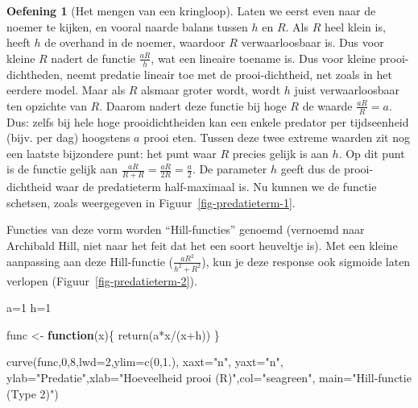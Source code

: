 \documentclass[
  a4paper,
]{scrbook}
\newenvironment{Shaded}{\begin{snugshade}}{\end{snugshade}}
\newcommand{\AttributeTok}[1]{\textcolor[rgb]{0.40,0.45,0.13}{#1}}
\newcommand{\ControlFlowTok}[1]{\textcolor[rgb]{0.00,0.23,0.31}{\textbf{#1}}}
\newcommand{\DecValTok}[1]{\textcolor[rgb]{0.68,0.00,0.00}{#1}}
\newcommand{\FloatTok}[1]{\textcolor[rgb]{0.68,0.00,0.00}{#1}}
\newcommand{\FunctionTok}[1]{\textcolor[rgb]{0.28,0.35,0.67}{#1}}
\newcommand{\NormalTok}[1]{\textcolor[rgb]{0.00,0.23,0.31}{#1}}
\newcommand{\OtherTok}[1]{\textcolor[rgb]{0.00,0.23,0.31}{#1}}
\newcommand{\SpecialCharTok}[1]{\textcolor[rgb]{0.37,0.37,0.37}{#1}}
\newcommand{\StringTok}[1]{\textcolor[rgb]{0.13,0.47,0.30}{#1}}
\theoremstyle{definition}
\newtheorem{exercise}{Oefening}[chapter]
\theoremstyle{remark}
\begin{document}
\begin{exercise}[Het mengen van een
kringloop]
Laten we eerst even naar de noemer te kijken, en vooral naarde balans
tussen \(h\) en \(R\). Als \(R\) heel klein is, heeft \(h\) de overhand
in de noemer, waardoor \(R\) verwaarloosbaar is. Dus voor kleine \(R\)
nadert de functie \(\frac{aR}{h}\), wat een lineaire toename is. Dus
voor kleine prooi-dichtheden, neemt predatie lineair toe met de
prooi-dichtheid, net zoals in het eerdere model. Maar als \(R\) alsmaar
groter wordt, wordt \(h\) juist verwaarloosbaar ten opzichte van \(R\).
Daarom nadert deze functie bij hoge \(R\) de waarde
\(\frac{aR}{R} = a\). Dus: zelfs bij hele hoge prooidichtheiden kan een
enkele predator per tijdseenheid (bijv. per dag) hoogstens \(a\) prooi
eten. Tussen deze twee extreme waarden zit nog een laatste bijzondere
punt: het punt waar \(R\) precies gelijk is aan \(h\). Op dit punt is de
functie gelijk aan \(\frac{aR}{R+R}=\frac{aR}{2R}=\frac{a}{2}\). De
parameter \(h\) geeft dus de prooi-dichtheid waar de predatieterm
half-maximaal is. Nu kunnen we de functie schetsen, zoals weergegeven in
Figuur~\ref{fig-predatieterm-1}.

Functies van deze vorm worden ``Hill-functies'' genoemd (vernoemd naar
Archibald Hill, niet naar het feit dat het een soort heuveltje is). Met
een kleine aanpassing aan deze Hill-functie (\(\frac{aR^2}{h^2+R^2}\)),
kun je deze response ook sigmoide laten verlopen
(Figuur~\ref{fig-predatieterm-2}).

\begin{Shaded}
\begin{Highlighting}[]
\NormalTok{a}\OtherTok{=}\DecValTok{1}
\NormalTok{h}\OtherTok{=}\DecValTok{1}

\NormalTok{func }\OtherTok{\textless{}{-}} \ControlFlowTok{function}\NormalTok{(x)\{}
  \FunctionTok{return}\NormalTok{(a}\SpecialCharTok{*}\NormalTok{x}\SpecialCharTok{/}\NormalTok{(x}\SpecialCharTok{+}\NormalTok{h))}
\NormalTok{\}}

\FunctionTok{curve}\NormalTok{(func,}\DecValTok{0}\NormalTok{,}\DecValTok{8}\NormalTok{,}\AttributeTok{lwd=}\DecValTok{2}\NormalTok{,}\AttributeTok{ylim=}\FunctionTok{c}\NormalTok{(}\DecValTok{0}\NormalTok{,}\FloatTok{1.}\NormalTok{), }\AttributeTok{xaxt=}\StringTok{"n"}\NormalTok{, }\AttributeTok{yaxt=}\StringTok{"n"}\NormalTok{,}
      \AttributeTok{ylab=}\StringTok{"Predatie"}\NormalTok{,}\AttributeTok{xlab=}\StringTok{"Hoeveelheid prooi (R)"}\NormalTok{,}\AttributeTok{col=}\StringTok{"seagreen"}\NormalTok{,}
      \AttributeTok{main=}\StringTok{"Hill{-}functie (Type 2)"}\NormalTok{)}


\end{Highlighting}
\end{Shaded}
\end{exercise}
\end{document}
